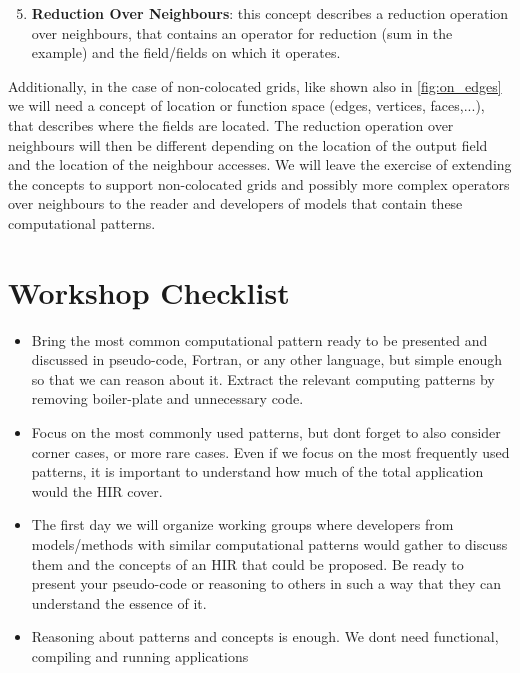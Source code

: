 \documentclass[a4paper,10pt]{scrartcl}
\begin{document}
\begin{enumerate}[label=\textbf{C.\arabic*}]
	  \setcounter{enumi}{4}
	\item \textbf{Reduction Over Neighbours}: this concept describes a reduction operation over neighbours, that contains an operator for reduction (sum in the example) and the field/fields on which it operates.
\end{enumerate}

Additionally, in the case of non-colocated grids, like shown also in \cref{fig:on_edges} we will need a concept of location or function space (edges, vertices, faces,...), 
that describes where the fields are located. The reduction operation over neighbours will then be different depending on the location of the output field and the location of the neighbour accesses.  
We will leave the exercise of extending the concepts to support non-colocated grids and 
possibly more complex operators over neighbours to the reader and developers of models that
contain these computational patterns. 

\section{Workshop Checklist}

\begin{itemize}
	\item Bring the most common computational pattern ready to be presented and discussed in pseudo-code, Fortran, or any other language, but simple enough so that we can reason about it. Extract the relevant computing patterns by removing boiler-plate and unnecessary code.
	\item Focus on the most commonly used patterns, but dont forget to also consider corner cases, or more rare cases. Even if we focus on the most frequently used patterns, it is important to understand how much of the total application would the HIR cover.
	\item The first day we will organize working groups where developers from models/methods with similar computational patterns would gather to discuss them and the concepts of an HIR that could be proposed. Be ready to present your pseudo-code or reasoning to others in such a way that they can understand the essence of it.
	\item Reasoning about patterns and concepts is enough. We dont need functional, compiling and running applications
\end{itemize}
\end{document}
